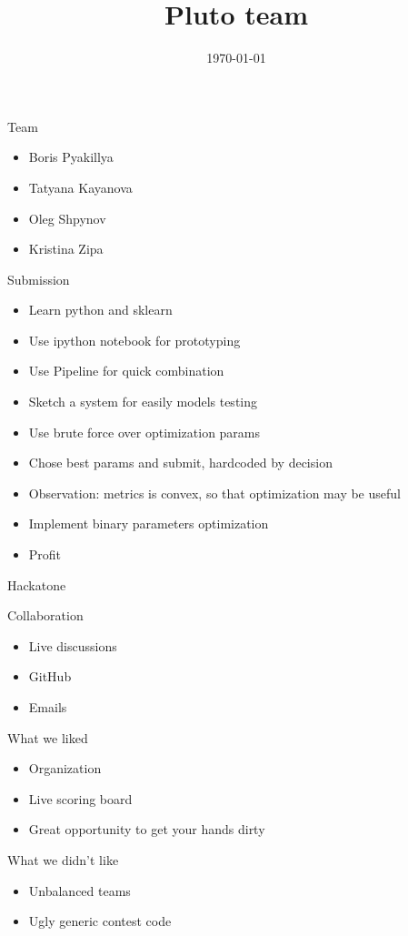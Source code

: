 \documentclass{beamer}
\title{Pluto team}
\institute{\#MSRMLI2015}
\date{\today}
\begin{document}
\begin{frame}
  \titlepage
\end{frame}

\begin{frame}{Team}
\begin{itemize}
\item Boris Pyakillya
\item Tatyana Kayanova
\item Oleg Shpynov
\item Kristina Zipa
\end{itemize}
\end{frame}

\begin{frame}{Submission}
\begin{itemize}
\item Learn python and sklearn
\item Use ipython notebook for prototyping
\item Use Pipeline for quick combination
\item Sketch a system for easily models testing
\item Use brute force over optimization params
\item Chose best params and submit, hardcoded by decision
\item Observation: metrics is convex, so that optimization may be useful
\item Implement binary parameters optimization
\item Profit
\end{itemize}
\end{frame}

\begin{frame}{Hackatone}
\begin{block}{Collaboration}
\begin{itemize}
	\item Live discussions
	\item GitHub
	\item Emails
\end{itemize}
\end{block}
\begin{block}{What we liked}
\begin{itemize}
	\item Organization
	\item Live scoring board
	\item Great opportunity to get your hands dirty
\end{itemize}
\end{block}
\begin{block}{What we didn't like}
\begin{itemize}
	\item Unbalanced teams
	\item Ugly generic contest code
\end{itemize}
\end{block}
\end{frame}

\begin{frame}
\end{frame}
\end{document}
